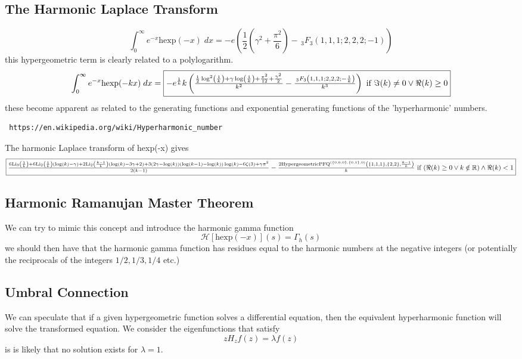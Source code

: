 \documentclass{article}
\begin{document}
\subsection{The Harmonic Laplace Transform}
$$                   
\int_0^\infty e^{-x}\textrm{hexp}(-x) \; dx =  -e \left(\frac{1}{2} \left(\gamma ^2+\frac{\pi ^2}{6}\right)-\, _3F_3(1,1,1;2,2,2;-1)\right)            
$$
this hypergeometric term is clearly related to a polylogarithm.
$$
\int_0^\infty e^{-x}\textrm{hexp}(-k x) \; dx = \fbox{$-e^{\frac{1}{k}} k \left(\frac{\frac{1}{2} \log ^2\left(\frac{1}{k}\right)+\gamma  \log \left(\frac{1}{k}\right)+\frac{\pi ^2}{12}+\frac{\gamma ^2}{2}}{k^2}-\frac{\,
    _3F_3\left(1,1,1;2,2,2;-\frac{1}{k}\right)}{k^3}\right)\text{ if }\Im(k)\neq 0\lor \Re(k)\geq 0$}
$$
these become apparent as related to the generating functions and exponential generating functions of the 'hyperharmonic' numbers.
\begin{verbatim} https://en.wikipedia.org/wiki/Hyperharmonic_number \end{verbatim}

The harmonic Laplace transform of hexp(-x) gives
$$
\fbox{$\frac{6 \text{Li}_3\left(\frac{1}{k}\right)+6 \text{Li}_2\left(\frac{1}{k}\right) (\log (k)-\gamma )+2 \text{Li}_2\left(\frac{k-1}{k}\right) (\log (k)-3 \gamma +2)+3 (2 \gamma -\log (k)) (\log (k-1)-\log (k))
    \log (k)-6 \zeta (3)+\gamma  \pi ^2}{2 (k-1)}-\frac{2 \text{HypergeometricPFQ}^{(\{0,0,0\},\{0,1\},0)}\left(\{1,1,1\},\{2,2\},\frac{k-1}{k}\right)}{k}\text{ if }(\Re(k)\geq 0\lor k\notin \mathbb{R})\land \Re(k)<1$}
$$


\subsection{Harmonic Ramanujan Master Theorem}
We can try to mimic this concept and introduce the harmonic gamma function
$$
\mathcal{H}[\textrm{hexp}(-x)](s) = \Gamma_h(s)
$$
we should then have that the harmonic gamma function has residues equal to the harmonic numbers at the negative integers (or potentially the reciprocals of the integers $1/2,1/3,1/4$ etc.)

\subsection{Umbral Connection}
We can speculate that if a given hypergeometric function solves a differential equation, then the equivalent hyperharmonic function will solve the transformed equation. We consider the eigenfunctions that satisfy
$$
z H_z f(z) = \lambda f(z)
$$
is is likely that no solution exists for $\lambda =1$.
\end{document}

